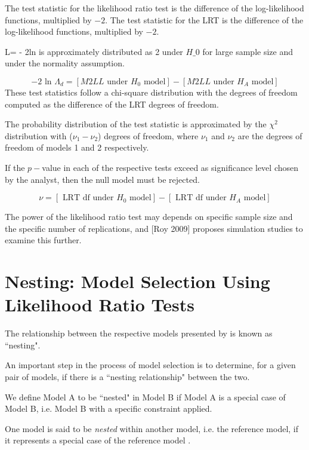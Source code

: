 \documentclass[12pt, a4paper]{report}
\theoremstyle{plain}
\theoremstyle{definition}
\theoremstyle{remark}
\begin{document}
The test statistic for the likelihood ratio test is the difference of the log-likelihood functions, multiplied by $-2$. 
The test statistic for the LRT is the difference of the log-likelihood functions, multiplied by $-2$.

L= - 2ln is approximately distributed as 2 under $H\_0$ for large sample size and under the normality assumption.

\begin{equation}
-2\mbox{ ln }\Lambda_{d} =  [ M2LL \mbox{ under }H_{0} \mbox{ model}] - [ M2LL \mbox{ under }H_{A} \mbox{ model}]
\end{equation}
These test statistics follow a chi-square distribution with the degrees of freedom computed as the difference of the LRT degrees of freedom.

The probability distribution of the test statistic is approximated by the $\chi^2$ distribution with ($\nu_{1} - \nu_{2}$) degrees of freedom, where $\nu_{1}$  and $\nu_{2}$ are the degrees of freedom of models 1 and 2 respectively.

If the $p-$value in each of the respective tests exceed as significance level chosen by the analyst, then the null model must be rejected.


\begin{equation}
\nu = [\mbox{ LRT df under }H_{0} \mbox{ model}] - [\mbox{ LRT df under }H_{A} \mbox{ model}]
\end{equation}

The power of the likelihood ratio test may depends on specific sample size and the specific number of replications, and [Roy 2009] proposes simulation studies to examine this further.




\section{Nesting: Model Selection Using Likelihood Ratio Tests}
The relationship between the respective models presented by \citet{roy} is known as ``nesting".

An important step in the process of model selection is to determine, for a given pair of models, if there is a ``nesting relationship" between the two.

We define Model A to be ``nested" in Model B if Model A is a special case of Model B, i.e. Model B with a specific constraint applied.

One model is said to be \emph{nested} within another model, i.e. the reference model, if it represents a special case of the reference model \citep{PB}.
\end{document}
